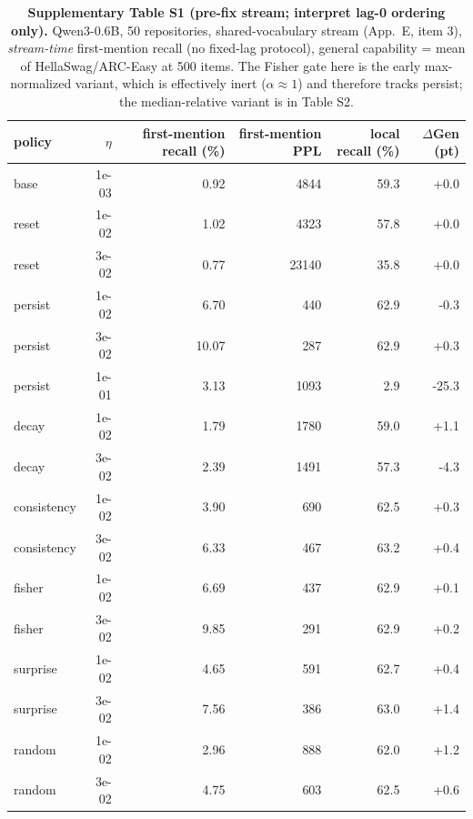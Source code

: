 \begin{table}[h]\centering\small
\caption{\textbf{Supplementary Table S1 (pre-fix stream; interpret lag-0 ordering only).} Qwen3-0.6B, 50 repositories, shared-vocabulary stream (App.~E, item 3), \emph{stream-time} first-mention recall (no fixed-lag protocol), general capability = mean of HellaSwag/ARC-Easy at 500 items. The Fisher gate here is the early max-normalized variant, which is effectively inert ($\alpha\approx1$) and therefore tracks persist; the median-relative variant is in Table S2.}
\begin{tabular}{l r r r r r}\toprule
policy & $\eta$ & first-mention recall (\%) & first-mention PPL & local recall (\%) & $\Delta$Gen (pt)\\\midrule
base & 1e-03 & 0.92 & 4844 & 59.3 & +0.0 \\
reset & 1e-02 & 1.02 & 4323 & 57.8 & +0.0 \\
reset & 3e-02 & 0.77 & 23140 & 35.8 & +0.0 \\
persist & 1e-02 & 6.70 & 440 & 62.9 & -0.3 \\
persist & 3e-02 & 10.07 & 287 & 62.9 & +0.3 \\
persist & 1e-01 & 3.13 & 1093 & 2.9 & -25.3 \\
decay & 1e-02 & 1.79 & 1780 & 59.0 & +1.1 \\
decay & 3e-02 & 2.39 & 1491 & 57.3 & -4.3 \\
consistency & 1e-02 & 3.90 & 690 & 62.5 & +0.3 \\
consistency & 3e-02 & 6.33 & 467 & 63.2 & +0.4 \\
fisher & 1e-02 & 6.69 & 437 & 62.9 & +0.1 \\
fisher & 3e-02 & 9.85 & 291 & 62.9 & +0.2 \\
surprise & 1e-02 & 4.65 & 591 & 62.7 & +0.4 \\
surprise & 3e-02 & 7.56 & 386 & 63.0 & +1.4 \\
random & 1e-02 & 2.96 & 888 & 62.0 & +1.2 \\
random & 3e-02 & 4.75 & 603 & 62.5 & +0.6 \\
\bottomrule\end{tabular}\end{table}

